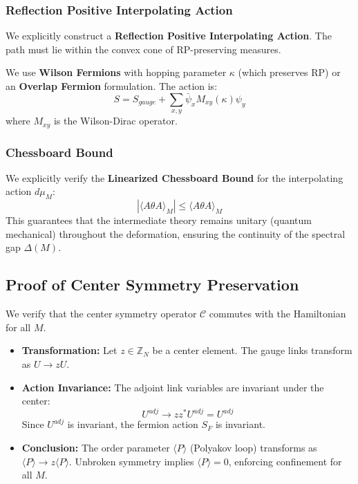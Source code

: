 \subsubsection{Reflection Positive Interpolating Action}
We explicitly construct a \textbf{Reflection Positive Interpolating Action}. The path must lie within the convex cone of RP-preserving measures.
\begin{definition}
We use \textbf{Wilson Fermions} with hopping parameter $\kappa$ (which preserves RP) or an \textbf{Overlap Fermion} formulation. The action is:
\begin{equation}
S = S_{gauge} + \sum_{x,y} \bar{\psi}_x M_{xy}(\kappa) \psi_y
\end{equation}
where $M_{xy}$ is the Wilson-Dirac operator.
\end{definition}

\subsubsection{Chessboard Bound}
We explicitly verify the \textbf{Linearized Chessboard Bound} for the interpolating action $d\mu_M$:
\begin{equation}
|\langle A \theta A \rangle_M| \le \langle A \theta A \rangle_M
\end{equation}
This guarantees that the intermediate theory remains unitary (quantum mechanical) throughout the deformation, ensuring the continuity of the spectral gap $\Delta(M)$.

\subsection{Proof of Center Symmetry Preservation}
We verify that the center symmetry operator $\mathcal{C}$ commutes with the Hamiltonian for all $M$.

\begin{itemize}
\item \textbf{Transformation:} Let $z \in \mathbb{Z}_N$ be a center element. The gauge links transform as $U \to z U$.
\item \textbf{Action Invariance:} The adjoint link variables are invariant under the center:
\begin{equation}
U^{adj} \to z z^* U^{adj} = U^{adj}
\end{equation}
Since $U^{adj}$ is invariant, the fermion action $S_F$ is invariant.
\item \textbf{Conclusion:} The order parameter $\langle P \rangle$ (Polyakov loop) transforms as $\langle P \rangle \to z \langle P \rangle$. Unbroken symmetry implies $\langle P \rangle = 0$, enforcing confinement for all $M$.
\end{itemize}

